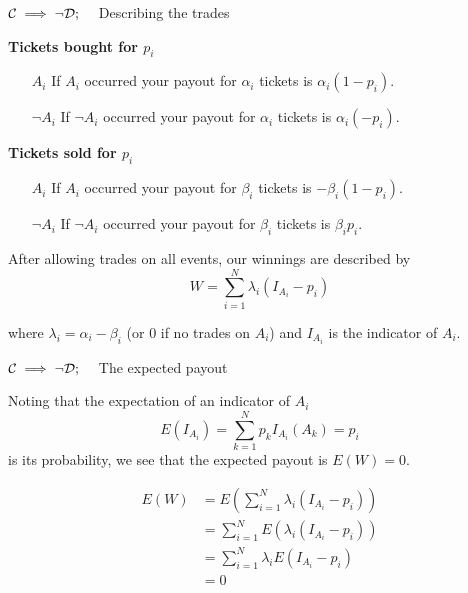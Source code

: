 \begin{frame}{$\mathcal{C}\implies\neg\mathcal{D};\quad$ Describing the trades}
\begin{minipage}{\linewidth}
\begin{minipage}[]{0.45\linewidth}
{\centering\textbf{Tickets bought for $p_i$}}
\begin{itemize}\itemsep0.5em
\item[$A_i$] If $A_i$ occurred your payout for $\alpha_i$ tickets is $\alpha_i(1-p_i)$.
\item[$\neg A_i$] If $\neg A_i$ occurred your payout for $\alpha_i$ tickets is $\alpha_i(-p_i)$.
\end{itemize}
\end{minipage}
\hfill
\begin{minipage}[]{0.45\linewidth}
{\centering\textbf{Tickets sold for $p_i$}}
\begin{itemize}\itemsep0.5em
\item[$A_i$] If $A_i$ occurred your payout for $\beta_i$ tickets is $-\beta_i(1-p_i)$.
\item[$\neg A_i$] If $\neg A_i$ occurred your payout for $\beta_i$ tickets is $\beta_ip_i$.
\end{itemize}
\end{minipage}
\end{minipage}
\vfill
\begin{minipage}{\linewidth}
After allowing trades on all events, our winnings are described by
\vspace{-5px}
$$W=\sum_{i=1}^N\lambda_i(I_{A_i}-p_i)$$

\vspace{-5px}where $\lambda_i=\alpha_i-\beta_i$ (or $0$ if no trades on $A_i$) and $I_{A_i}$ is the indicator of $A_i$.
\end{minipage}
\end{frame}

\begin{frame}{$\mathcal{C}\implies\neg\mathcal{D};\quad$ The expected payout}
\begin{minipage}{\linewidth}
\begin{minipage}[]{0.45\linewidth}
Noting that the expectation of an indicator of $A_i$
$$E(I_{A_i})=\sum_{k=1}^Np_kI_{A_i}(A_k)=p_i$$
is its probability, we see that the expected payout is $E(W)=0$.
\end{minipage}
\hfill
\begin{minipage}[]{0.45\linewidth}
\begin{equation*}
\begin{split}
E(W) & =E(\sum_{i=1}^N\lambda_i(I_{A_i}-p_i))\\
& =\sum_{i=1}^NE(\lambda_i(I_{A_i}-p_i)) \\
& =\sum_{i=1}^N\lambda_iE(I_{A_i}-p_i) \\
& = 0
\end{split}
\end{equation*}
\end{minipage}
\end{minipage}
\end{frame}

